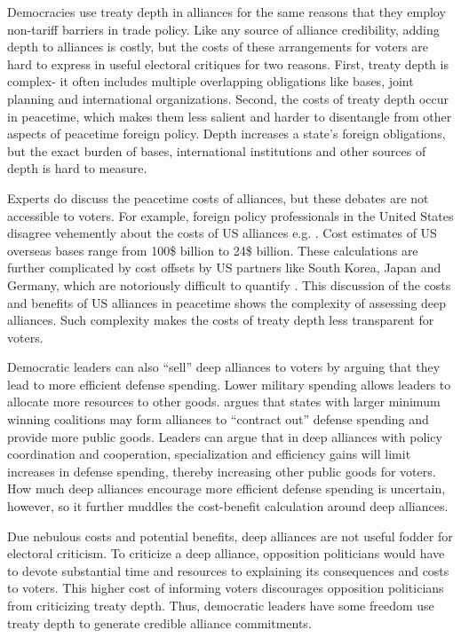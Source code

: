 \documentclass[12pt]{article}
\begin{document}
Democracies use treaty depth in alliances for the same reasons that they employ non-tariff barriers in trade policy.
Like any source of alliance credibility, adding depth to alliances is costly, but the costs of these arrangements for voters are hard to express in useful electoral critiques for two reasons.
First, treaty depth is complex- it often includes multiple overlapping obligations like bases, joint planning and international organizations.
Second, the costs of treaty depth occur in peacetime, which makes them less salient and harder to disentangle from other aspects of peacetime foreign policy. 
Depth increases a state's foreign obligations, but the exact burden of bases, international institutions and other sources of depth is hard to measure. 


Experts do discuss the peacetime costs of alliances, but these debates are not accessible to voters. 
For example, foreign policy professionals in the United States disagree vehemently about the costs of US alliances e.g. \citep{Brooksetal2013, Posen2014, BrandsFeaver2017}.
Cost estimates of US overseas bases range from 100\$ billion \citep{Vine2015} to 24\$ billion. 
These calculations are further complicated by cost offsets by US partners like South Korea, Japan and Germany, which are notoriously difficult to quantify \citep{Lostumboetal2013}.  
This discussion of the costs and benefits of US alliances in peacetime shows the complexity of assessing deep alliances. 
Such complexity makes the costs of treaty depth less transparent for voters. 


Democratic leaders can also ``sell'' deep alliances to voters by arguing that they lead to more efficient defense spending. 
Lower military spending allows leaders to allocate more resources to other goods.  
\citet{Kimball2010} argues that states with larger minimum winning coalitions may form alliances to ``contract out'' 
defense spending and provide more public goods. 
Leaders can argue that in deep alliances with policy coordination and cooperation, specialization and efficiency gains will limit increases in defense spending, thereby increasing other public goods for voters.  
How much deep alliances encourage more efficient defense spending is uncertain, however, so it further muddles the cost-benefit calculation around deep alliances. 


Due nebulous costs and potential benefits, deep alliances are not useful fodder for electoral criticism.
To criticize a deep alliance, opposition politicians would have to devote substantial time and resources to explaining its consequences and costs to voters.  
This higher cost of informing voters discourages opposition politicians from criticizing treaty depth. 
Thus, democratic leaders have some freedom use treaty depth to generate credible alliance commitments. 
\end{document}
